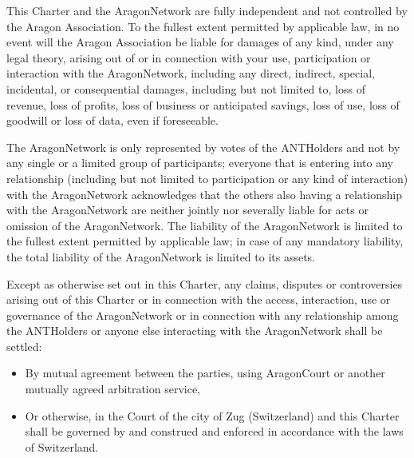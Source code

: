 \begin{enumerate}
	This Charter and the \gls{AragonNetwork} are fully independent and not controlled by the Aragon Association.
	To the fullest extent permitted by applicable law, in no event will the Aragon Association be liable for damages of any kind, under any legal theory, arising out of or in connection with your use, participation or interaction with the \gls{AragonNetwork}, including any direct, indirect, special, incidental, or consequential damages, including but not limited to, loss of revenue, loss of profits, loss of business or anticipated savings, loss of use, loss of goodwill or loss of data, even if foreseeable.
	
	The \gls{AragonNetwork} is only represented by votes of the \glspl{ANTHolder} and not by any single or a limited group of participants; 
	everyone that is entering into any relationship (including but not limited to participation or any kind of interaction) with the \gls{AragonNetwork} acknowledges that the others also having a relationship with the \gls{AragonNetwork} are neither jointly nor severally liable for acts or omission of the \gls{AragonNetwork}.
	The liability of the \gls{AragonNetwork} is limited to the fullest extent permitted by applicable law; in case of any mandatory liability, the total liability of the \gls{AragonNetwork} is limited to its assets.
	
	Except as otherwise set out in this Charter, any claims, disputes or controversies arising out of this Charter or in connection with the access, interaction, use or governance of the \gls{AragonNetwork} or in connection with any relationship among the \glspl{ANTHolder} or anyone else interacting with the \gls{AragonNetwork} shall be settled:
	\begin{itemize}
		\item By mutual agreement between the parties, using \gls{AragonCourt} or another mutually agreed arbitration service,
		\item Or otherwise, in the Court of the city of Zug (Switzerland) and this Charter shall be governed by and construed and enforced in accordance with the laws of Switzerland.
	\end{itemize}

\end{enumerate}

